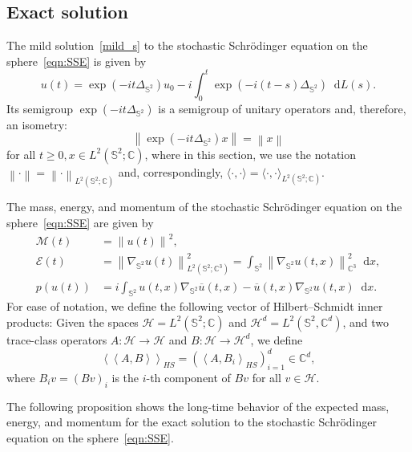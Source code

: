 \documentclass[11pt]{amsart}
\newcommand{\IC}{\mathbb{C}}
\newcommand{\IS}{\mathbb{S}}
\newcommand{\cE}{\mathcal E}
\newcommand{\cM}{\mathcal M}
\providecommand{\norm}[1]{\left\lVert#1\right\rVert}
\newcommand*\dd{\mathop{}\!\mathrm{d}}
\newcommand{\expp}[1]{\exp\left(#1\right)}
\newcommand{\Deltalb}{\Delta_{\IS^2}}
\newcommand{\nablalb}{\nabla_{\IS^{2}}}
\begin{document}
\subsection{Exact solution}\label{sch-exact}
The mild solution~\eqref{mild_s} to the stochastic Schr\"odinger equation on the sphere~\eqref{eqn:SSE} is given by
\begin{equation}
    \label{eqn:SSE_mildsol}
    u(t) = \expp{-it\Deltalb}u_0 - i \int_{0}^{t}\expp{-i(t-s)\Deltalb}\dd L(s).
\end{equation}
Its semigroup $\expp{-it\Deltalb}$ is a semigroup of unitary operators and, therefore, an isometry:
\begin{equation}
    \label{eqn:SSE_SG_isometry}
    \norm{\expp{-it\Deltalb}x} = \norm{x}
\end{equation} 
for all $t \geq 0, x \in {L^2(\IS^2; \IC)}$, where in this section, we use the notation $\norm{\cdot} = \norm{\cdot}_{L^2(\IS^2; \IC)}$ and, correspondingly, $\langle \cdot, \cdot \rangle =\langle \cdot, \cdot \rangle_{L^2({\IS^{2}}; \IC)}$.


The mass, energy, and momentum of the stochastic Schr\"odinger equation on the sphere~\eqref{eqn:SSE} are given by
\begin{align}
    \cM(t) &= \norm{u(t)}^2,\label{eqn:def_mass}\\
    \cE(t) &= \norm{\nablalb u(t)}_{L^2(\IS^2; \IC^3)}^2 = \int_{\IS^{2}} \norm{\nablalb u(t, x)}_{\IC^3}^2 \dd x, \label{eqn:def_energy}\\
    p(u(t)) &= i\int_{\IS^{2}} u(t,x)\nablalb \overline{u}(t,x) - \overline{u}(t,x)\nablalb u(t,x) \dd x.\label{eqn:def_mom}
\end{align}
For ease of notation, we define the following vector of Hilbert--Schmidt inner products:
Given the spaces $\mathcal{H}=L^2({\IS^{2}}; \IC)$ and $\mathcal{H}^d = L^2({\IS^{2}}, \IC^d)$, and
two trace-class operators $A\colon \mathcal{H} \to \mathcal{H}$ and $B\colon \mathcal{H} \to \mathcal{H}^d$, we define
$$
\left<\left<A,B\right>\right>_{HS}=(\left<A,B_i\right>_{HS})_{i=1}^d\in\mathbb{C}^d,
$$
where $B_i v = (Bv)_i$ is the $i$-th component of $Bv$ for all $v \in \mathcal{H}$.

The following proposition shows the long-time behavior of the expected mass, energy, and momentum for
the exact solution to the stochastic Schrödinger equation on the sphere~\eqref{eqn:SSE}.
\end{document}
